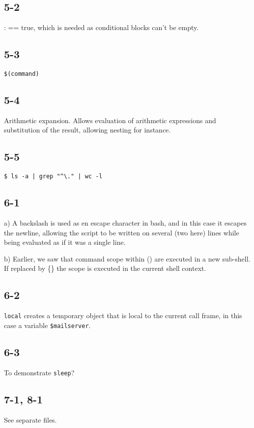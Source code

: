 \subsection{5-2}
: == true, which is needed as conditional blocks can't be empty.

\subsection{5-3}
\verb=$(command)=

\subsection{5-4}
Arithmetic expansion. Allows evaluation of arithmetic expressions and substitution of the result, allowing nesting for instance.

\subsection{5-5}

\verb=$ ls -a | grep "^\." | wc -l=

\subsection{6-1}
a) A backslash is used as en escape character in bash, and in this case it escapes the newline, allowing the script to be written on several (two here) lines while being evaluated as if it was a single line.

b) Earlier, we saw that command scope within () are executed in a new sub-shell. If replaced by \{\} the scope is executed in the current shell context.

\subsection{6-2}
\verb=local= creates a temporary object that is local to the current call frame, in this case a variable \verb=$mailserver=.

\subsection{6-3}
To demonstrate \verb=sleep=?

\subsection{7-1, 8-1}

See separate files.

